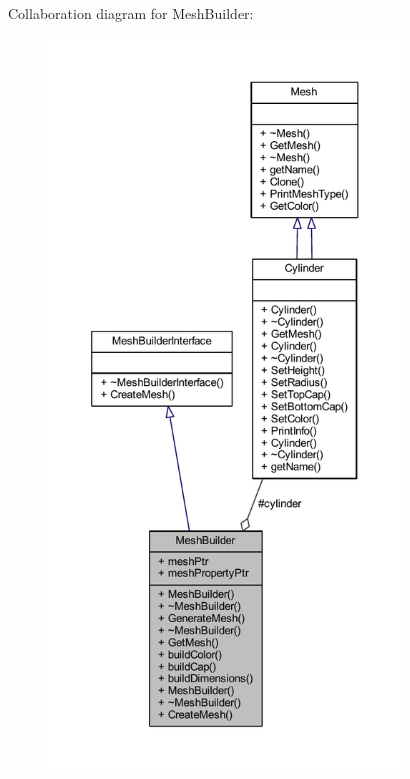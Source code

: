 Collaboration diagram for Mesh\+Builder\+:
\nopagebreak
\begin{figure}[H]
\begin{center}
\leavevmode
\includegraphics[height=550pt]{class_mesh_builder__coll__graph}
\end{center}
\end{figure}
